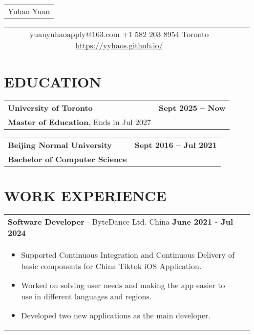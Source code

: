\documentclass[a4paper,12pt]{article}
\begin{document}
\pagestyle{empty} 

\begin{tabularx}{\linewidth}{@{} C @{}}
\Huge{Yuhao Yuan} \\[6pt]
\end{tabularx}

\begin{tabularx}{\linewidth}{@{} C @{} C @{} C}
{{\raisebox{-0.05\height}{\faEnvelope} yuanyuhaoapply@163.com}} 
{{\raisebox{-0.05\height}{\faMobile} +1 582 203 8954}} 
{{\raisebox{-0.05\height}{\faMapMarker} Toronto}}
{{\href{https://yyhaos.github.io/}{\raisebox{-0.05\height}{\faGithub} https://yyhaos.github.io/}}}
\end{tabularx}

\hfill
\section{\textbf{EDUCATION}}
\begin{tabularx}{\linewidth}{ @{}X r@{} }
    \textbf{University of Toronto} & \textbf{Sept 2025 -- Now} \\[4pt]
    \textbf{Master of Education}, Ends in Jul 2027\\[4pt]
\end{tabularx}
\begin{tabularx}{\linewidth}{ @{}X r@{} }
    \textbf{Beijing Normal University} & \textbf{Sept 2016 -- Jul 2021} \\[4pt]
    \textbf{Bachelor of Computer Science}\\[4pt]
\end{tabularx}
\hfill
\section{\textbf{WORK EXPERIENCE}}
\begin{tabularx}{\linewidth}{ @{}l r@{} }
\textbf{Software Developer} - ByteDance Ltd. China \hfill \textbf{June 2021 - Jul 2024} \\[4pt]
\begin{minipage}[t]{\linewidth}
    \begin{itemize}[nosep,after=\strut, leftmargin=1em, itemsep=2pt]
        \item Supported Continuous Integration and Continuous Delivery of basic components for China Tiktok iOS Application.
        \item Worked on solving user needs and making the app easier to use in different languages and regions.
        \item Developed two new applications as the main developer.
    \end{itemize}
\end{minipage}
\end{tabularx}
\end{document}
